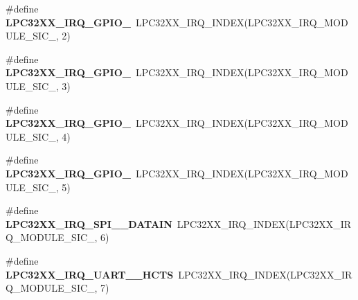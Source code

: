 \begin{DoxyCompactItemize}
\item 
\mbox{\label{group__lpc32xx__interrupt_ga41be02671d032661b0fff09db4d982df}} 
\#define {\bfseries L\+P\+C32\+X\+X\+\_\+\+I\+R\+Q\+\_\+\+G\+P\+I\+O\+\_}~L\+P\+C32\+X\+X\+\_\+\+I\+R\+Q\+\_\+\+I\+N\+D\+EX(L\+P\+C32\+X\+X\+\_\+\+I\+R\+Q\+\_\+\+M\+O\+D\+U\+L\+E\+\_\+\+S\+I\+C\+\_, 2)
\item 
\mbox{\label{group__lpc32xx__interrupt_ga14314c77474ccc63ce3a09a55c645cce}} 
\#define {\bfseries L\+P\+C32\+X\+X\+\_\+\+I\+R\+Q\+\_\+\+G\+P\+I\+O\+\_}~L\+P\+C32\+X\+X\+\_\+\+I\+R\+Q\+\_\+\+I\+N\+D\+EX(L\+P\+C32\+X\+X\+\_\+\+I\+R\+Q\+\_\+\+M\+O\+D\+U\+L\+E\+\_\+\+S\+I\+C\+\_, 3)
\item 
\mbox{\label{group__lpc32xx__interrupt_gafedd48f05a5f7b815ebf61f8d52dfb13}} 
\#define {\bfseries L\+P\+C32\+X\+X\+\_\+\+I\+R\+Q\+\_\+\+G\+P\+I\+O\+\_}~L\+P\+C32\+X\+X\+\_\+\+I\+R\+Q\+\_\+\+I\+N\+D\+EX(L\+P\+C32\+X\+X\+\_\+\+I\+R\+Q\+\_\+\+M\+O\+D\+U\+L\+E\+\_\+\+S\+I\+C\+\_, 4)
\item 
\mbox{\label{group__lpc32xx__interrupt_ga2a047374c5777de327040abe36e95f8d}} 
\#define {\bfseries L\+P\+C32\+X\+X\+\_\+\+I\+R\+Q\+\_\+\+G\+P\+I\+O\+\_}~L\+P\+C32\+X\+X\+\_\+\+I\+R\+Q\+\_\+\+I\+N\+D\+EX(L\+P\+C32\+X\+X\+\_\+\+I\+R\+Q\+\_\+\+M\+O\+D\+U\+L\+E\+\_\+\+S\+I\+C\+\_, 5)
\item 
\mbox{\label{group__lpc32xx__interrupt_ga6b4a0e62d56d2a7204f03cdda2094dc6}} 
\#define {\bfseries L\+P\+C32\+X\+X\+\_\+\+I\+R\+Q\+\_\+\+S\+P\+I\+\_\+\_\+\+D\+A\+T\+A\+IN}~L\+P\+C32\+X\+X\+\_\+\+I\+R\+Q\+\_\+\+I\+N\+D\+EX(L\+P\+C32\+X\+X\+\_\+\+I\+R\+Q\+\_\+\+M\+O\+D\+U\+L\+E\+\_\+\+S\+I\+C\+\_, 6)
\item 
\mbox{\label{group__lpc32xx__interrupt_ga745d159bd3ea46c2d131d00b851da32b}} 
\#define {\bfseries L\+P\+C32\+X\+X\+\_\+\+I\+R\+Q\+\_\+\+U\+A\+R\+T\+\_\+\_\+\+H\+C\+TS}~L\+P\+C32\+X\+X\+\_\+\+I\+R\+Q\+\_\+\+I\+N\+D\+EX(L\+P\+C32\+X\+X\+\_\+\+I\+R\+Q\+\_\+\+M\+O\+D\+U\+L\+E\+\_\+\+S\+I\+C\+\_, 7)
\item 
\mbox{\label{group__lpc32xx__interrupt_ga0ecd7cafbf445b414c16dc5570006a64}} 

\end{DoxyCompactItemize}
